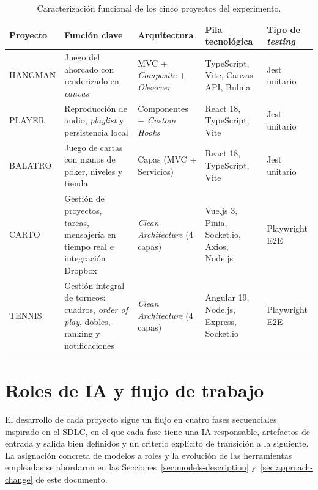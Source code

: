 \begin{table}[H]
\centering
\small
\renewcommand{\arraystretch}{1.2}
\begin{tabularx}{\textwidth}{|>{\raggedright\arraybackslash}p{1.8cm}|Y|>{\raggedright\arraybackslash}p{2.6cm}|Y|>{\raggedright\arraybackslash}p{2cm}|}
\hline
\textbf{Proyecto} & \textbf{Función clave} & \textbf{Arquitectura} & \textbf{Pila tecnológica} & \textbf{Tipo de \textit{testing}} \\
\hline
\ac{HANGMAN} & Juego del ahorcado con renderizado en \textit{canvas} & \ac{MVC} + \textit{Composite} + \textit{Observer} & TypeScript, Vite, Canvas \ac{API}, Bulma & Jest unitario \\
\hline
\ac{PLAYER} & Reproducción de audio, \textit{playlist} y persistencia local & Componentes + \textit{Custom Hooks} & React 18, TypeScript, Vite & Jest unitario \\
\hline
\ac{BALATRO} & Juego de cartas con manos de póker, niveles y tienda & Capas (\ac{MVC} + Servicios) & React 18, TypeScript, Vite & Jest unitario \\
\hline
\ac{CARTO} & Gestión de proyectos, tareas, mensajería en tiempo real e integración Dropbox & \textit{Clean Architecture} (4 capas) & Vue.js 3, Pinia, Socket.io, Axios, Node.js & Playwright E2E \\
\hline
\ac{TENNIS} & Gestión integral de torneos: cuadros, \textit{order of play}, dobles, ranking y notificaciones & \textit{Clean Architecture} (4 capas) & Angular 19, Node.js, Express, Socket.io & Playwright E2E \\
\hline
\end{tabularx}
\caption{Caracterización funcional de los cinco proyectos del experimento.}
\label{tab:proyectos-resumen}
\end{table}

\section{Roles de IA y flujo de trabajo} \label{sec:flujo-trabajo}

El desarrollo de cada proyecto sigue un flujo en cuatro fases secuenciales inspirado en el \ac{SDLC}, en el que cada fase tiene una \ac{IA} responsable, artefactos de entrada y salida bien definidos y un criterio explícito de transición a la siguiente. La asignación concreta de modelos a roles y la evolución de las herramientas empleadas se abordaron en las Secciones~\ref{sec:models-description} y~\ref{sec:approach-change} de este documento.\\

